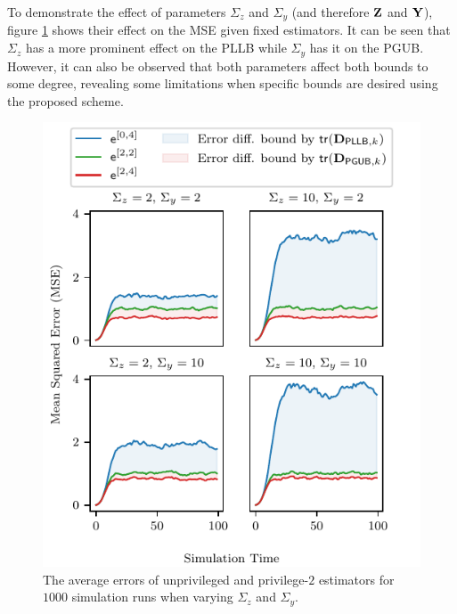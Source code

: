 To demonstrate the effect of parameters $\Sigma_z$ and $\Sigma_y$ (and therefore ${{\mathbf{Z}}}$ and ${{\mathbf{Y}}}$), figure \ref{fig:mse_params} shows their effect on the MSE given fixed estimators. It can be seen that $\Sigma_z$ has a more prominent effect on the PLLB while $\Sigma_y$ has it on the PGUB. However, it can also be observed that both parameters affect both bounds to some degree, revealing some limitations when specific bounds are desired using the proposed scheme.
\begin{figure}[htbp]
  \centering
  \includegraphics{figures/mse_params.pdf}
  \caption{The average errors of unprivileged and privilege-$2$ estimators for $1000$ simulation runs when varying $\Sigma_z$ and $\Sigma_y$.}
  \label{fig:mse_params}
\end{figure}
